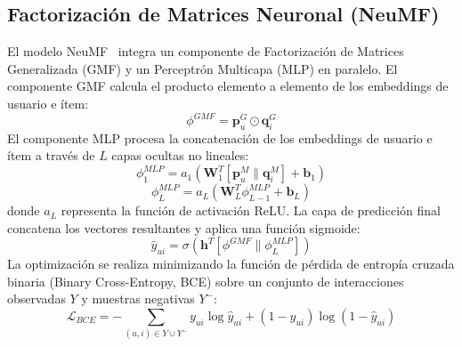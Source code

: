\documentclass[journal]{IEEEtran}
\begin{document}
\subsection{Factorización de Matrices Neuronal (NeuMF)}
El modelo NeuMF~\cite{he2017neural} integra un componente de Factorización de Matrices Generalizada (GMF) y un Perceptrón Multicapa (MLP) en paralelo. El componente GMF calcula el producto elemento a elemento de los embeddings de usuario e ítem:
\begin{equation}
\phi^{GMF} = \mathbf{p}_u^G \odot \mathbf{q}_i^G
\end{equation}
El componente MLP procesa la concatenación de los embeddings de usuario e ítem a través de $L$ capas ocultas no lineales:
\begin{equation}
\phi_1^{MLP} = a_1(\mathbf{W}_1^T [\mathbf{p}_u^M \parallel \mathbf{q}_i^M] + \mathbf{b}_1)
\end{equation}
\begin{equation}
\phi_L^{MLP} = a_L(\mathbf{W}_L^T \phi_{L-1}^{MLP} + \mathbf{b}_L)
\end{equation}
donde $a_L$ representa la función de activación ReLU. La capa de predicción final concatena los vectores resultantes y aplica una función sigmoide:
\begin{equation}
\hat{y}_{ui} = \sigma(\mathbf{h}^T [\phi^{GMF} \parallel \phi_L^{MLP}])
\end{equation}
La optimización se realiza minimizando la función de pérdida de entropía cruzada binaria (Binary Cross-Entropy, BCE) sobre un conjunto de interacciones observadas $Y$ y muestras negativas $Y^-$:
\begin{equation}
\mathcal{L}_{BCE} = -\sum_{(u, i) \in Y \cup Y^-} y_{ui} \log \hat{y}_{ui} + (1 - y_{ui}) \log (1 - \hat{y}_{ui})
\end{equation}
\end{document}
